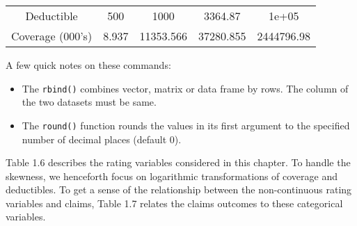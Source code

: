 \documentclass[]{book}
\theoremstyle{definition}
\theoremstyle{definition}
\theoremstyle{definition}
\theoremstyle{remark}
\begin{document}
\begin{longtable}[]{@{}ccccc@{}}
\begin{minipage}[t]{0.23\columnwidth}
Deductible\strut
\end{minipage} & \begin{minipage}[t]{0.12\columnwidth}\centering\strut
500\strut
\end{minipage} & \begin{minipage}[t]{0.14\columnwidth}\centering\strut
1000\strut
\end{minipage} & \begin{minipage}[t]{0.14\columnwidth}\centering\strut
3364.87\strut
\end{minipage} & \begin{minipage}[t]{0.16\columnwidth}\centering\strut
1e+05\strut
\end{minipage}\tabularnewline
\begin{minipage}[t]{0.23\columnwidth}\centering\strut
Coverage (000's)\strut
\end{minipage} & \begin{minipage}[t]{0.12\columnwidth}\centering\strut
8.937\strut
\end{minipage} & \begin{minipage}[t]{0.14\columnwidth}\centering\strut
11353.566\strut
\end{minipage} & \begin{minipage}[t]{0.14\columnwidth}\centering\strut
37280.855\strut
\end{minipage} & \begin{minipage}[t]{0.16\columnwidth}\centering\strut
2444796.98\strut
\end{minipage}\tabularnewline
\bottomrule
\end{longtable}

A few quick notes on these commands:

\begin{itemize}
\item
  The \texttt{rbind()} combines vector, matrix or data frame by rows.
  The column of the two datasets must be same.
\item
  The \texttt{round()} function rounds the values in its first argument
  to the specified number of decimal places (default 0).
\end{itemize}

Table 1.6 describes the rating variables considered in this chapter. To
handle the skewness, we henceforth focus on logarithmic transformations
of coverage and deductibles. To get a sense of the relationship between
the non-continuous rating variables and claims, Table 1.7 relates the
claims outcomes to these categorical variables.
\end{document}
